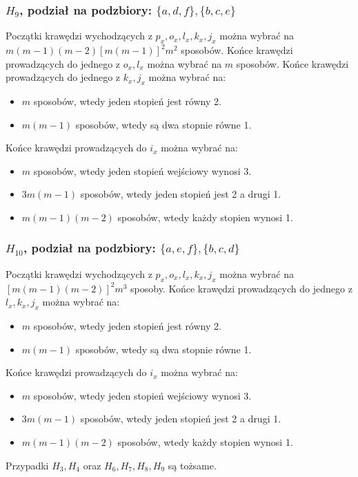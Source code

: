 \documentclass{article}
\begin{document}
\subsubsection{$H_9$, podział na podzbiory: $\{ a,d,f \}, \{ b,c,e \}$}
Początki krawędzi wychodzących z $p_x, o_x, l_x, k_x, j_x$ można wybrać na $m(m-1)(m-2)[m(m-1)]^2m^2$ sposobów. Końce krawędzi prowadzących do jednego z $o_x, l_x$ można wybrać na $m$ sposobów. Końce krawędzi prowadzących do jednego z $k_x,j_x$ można wybrać na:
\begin{itemize}
  \item $m$ sposobów, wtedy jeden stopień jest równy 2.
  \item $m(m-1)$ sposobów, wtedy są dwa stopnie równe 1.
\end{itemize}
Końce krawędzi prowadzących do $i_x$ można wybrać na:
\begin{itemize}
  \item $m$ sposobów, wtedy jeden stopień wejściowy wynosi 3.
  \item $3m(m-1)$ sposobów, wtedy jeden stopień jest 2 a drugi 1.
  \item $m(m-1)(m-2)$ sposobów, wtedy każdy stopien wynosi 1.
\end{itemize}

\subsubsection{$H_{10}$, podział na podzbiory: $\{ a,e,f \}, \{ b,c,d \}$}
Początki krawędzi wychodzących z $p_x, o_x, l_x, k_x, j_x$ można wybrać na $[m(m-1)(m-2)]^2m^3$ sposoby. Końce krawędzi prowadzących do jednego z $l_x, k_x, j_x$ można wybrać na:
\begin{itemize}
  \item $m$ sposobów, wtedy jeden stopień jest równy 2.
  \item $m(m-1)$ sposobów, wtedy są dwa stopnie równe 1.
\end{itemize}
Końce krawędzi prowadzących do $i_x$ można wybrać na:
\begin{itemize}
  \item $m$ sposobów, wtedy jeden stopień wejściowy wynosi 3.
  \item $3m(m-1)$ sposobów, wtedy jeden stopień jest 2 a drugi 1.
  \item $m(m-1)(m-2)$ sposobów, wtedy każdy stopien wynosi 1.
\end{itemize}
Przypadki $H_3, H_4$ oraz $H_6, H_7, H_8, H_9$ są tożsame.
\end{document}
